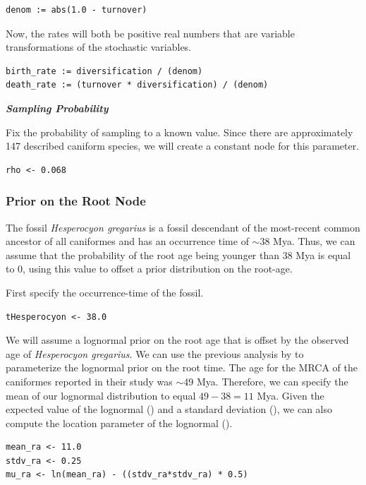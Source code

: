 {\tt \begin{snugshade*}
\begin{lstlisting}
denom := abs(1.0 - turnover) 
\end{lstlisting}
\end{snugshade*}}

Now, the rates will both be positive real numbers that are variable transformations of the stochastic variables.
{\tt \begin{snugshade*}
\begin{lstlisting}
birth_rate := diversification / (denom)
death_rate := (turnover * diversification) / (denom)
\end{lstlisting}
\end{snugshade*}}

\textbf{\textit{Sampling Probability}}

Fix the probability of sampling to a known value. Since there are approximately 147 described caniform species, we will create a constant node for this parameter.
{\tt \begin{snugshade*}
\begin{lstlisting}
rho <- 0.068
\end{lstlisting}
\end{snugshade*}}

\subsubsection{Prior on the Root Node}

The fossil \textit{Hesperocyon gregarius} is a fossil descendant of the most-recent common ancestor of all caniformes and has an occurrence time of $\sim$38 Mya.
Thus, we can assume that the probability of the root age being younger than 38 Mya is equal to 0, using this value to offset a prior distribution on the root-age.

First specify the occurrence-time of the fossil.
{\tt \begin{snugshade*}
\begin{lstlisting}
tHesperocyon <- 38.0
\end{lstlisting}
\end{snugshade*}}

We will assume a lognormal prior on the root age that is offset by the observed age of \textit{Hesperocyon gregarius}. 
We can use the previous analysis by \citet{dosReis2012} to parameterize the lognormal prior on the root time. 
The age for the MRCA of the caniformes reported in their study was $\sim$49 Mya. 
Therefore, we can specify the mean of our lognormal distribution to equal $49 - 38 = 11$ Mya.
Given the expected value of the lognormal () and a standard deviation (), we can also compute the location parameter of the lognormal ().
{\tt \begin{snugshade*}
\begin{lstlisting}
mean_ra <- 11.0
stdv_ra <- 0.25
mu_ra <- ln(mean_ra) - ((stdv_ra*stdv_ra) * 0.5)
\end{lstlisting}
\end{snugshade*}}

